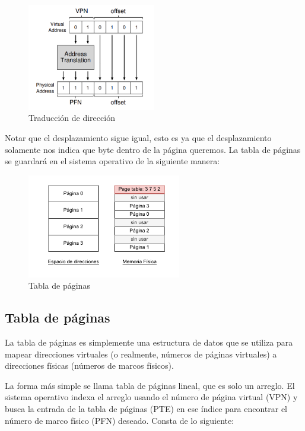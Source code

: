 \documentclass{article}
\begin{document}
\begin{figure}[h]
    \centering
    \includegraphics[width=0.5\textwidth]{src/traduccion.png}
    \caption{Traducción de dirección}
\end{figure}

Notar que el desplazamiento sigue igual, esto es ya que el desplazamiento solamente nos indica que byte dentro de la página queremos. La tabla de páginas se guardará en el sistema operativo de la siguiente manera:

\begin{figure}[h]
    \centering
    \includegraphics[width=0.6\textwidth]{src/tablapaginas.pdf}
    \caption{Tabla de páginas}
\end{figure}

\subsection{Tabla de páginas}

\begin{definition}
    La tabla de páginas es simplemente una estructura de datos que se utiliza para mapear direcciones virtuales (o realmente, números de páginas virtuales) a direcciones físicas (números de marcos físicos).
\end{definition}

La forma más simple se llama tabla de páginas lineal, que es solo un arreglo. El sistema operativo indexa el arreglo usando el número de página virtual (VPN) y busca la entrada de la tabla de páginas (PTE) en ese índice para encontrar el número de marco físico (PFN) deseado. Consta de lo siguiente:
\end{document}
